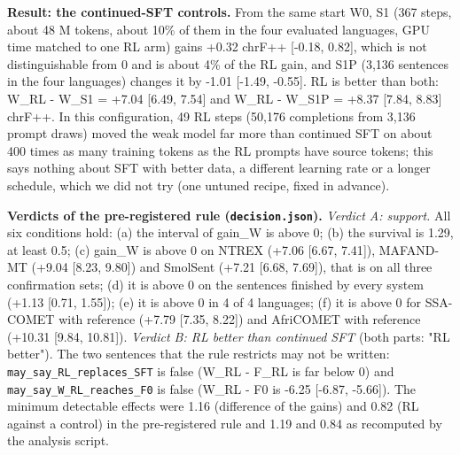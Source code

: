 \textbf{Result: the continued-SFT controls.} From the same start W0, S1 (367 steps, about 48 M tokens, about 10\% of them in the four evaluated languages, GPU time matched to one RL arm) gains +0.32 chrF++ {[}-0.18, 0.82{]}, which is not distinguishable from 0 and is about 4\% of the RL gain, and S1P (3,136 sentences in the four languages) changes it by -1.01 {[}-1.49, -0.55{]}. RL is better than both: W\_RL - W\_S1 = +7.04 {[}6.49, 7.54{]} and W\_RL - W\_S1P = +8.37 {[}7.84, 8.83{]} chrF++. In this configuration, 49 RL steps (50,176 completions from 3,136 prompt draws) moved the weak model far more than continued SFT on about 400 times as many training tokens as the RL prompts have source tokens; this says nothing about SFT with better data, a different learning rate or a longer schedule, which we did not try (one untuned recipe, fixed in advance).

\textbf{Verdicts of the pre-registered rule (\texttt{decision.json}).} \emph{Verdict A: support.} All six conditions hold: (a) the interval of gain\_W is above 0; (b) the survival is 1.29, at least 0.5; (c) gain\_W is above 0 on NTREX (+7.06 {[}6.67, 7.41{]}), MAFAND-MT (+9.04 {[}8.23, 9.80{]}) and SmolSent (+7.21 {[}6.68, 7.69{]}), that is on all three confirmation sets; (d) it is above 0 on the sentences finished by every system (+1.13 {[}0.71, 1.55{]}); (e) it is above 0 in 4 of 4 languages; (f) it is above 0 for SSA-COMET with reference (+7.79 {[}7.35, 8.22{]}) and AfriCOMET with reference (+10.31 {[}9.84, 10.81{]}). \emph{Verdict B: RL better than continued SFT} (both parts: "RL better"). The two sentences that the rule restricts may not be written: \texttt{may\_say\_RL\_replaces\_SFT} is false (W\_RL - F\_RL is far below 0) and \texttt{may\_say\_W\_RL\_reaches\_F0} is false (W\_RL - F0 is -6.25 {[}-6.87, -5.66{]}). The minimum detectable effects were 1.16 (difference of the gains) and 0.82 (RL against a control) in the pre-registered rule and 1.19 and 0.84 as recomputed by the analysis script.

